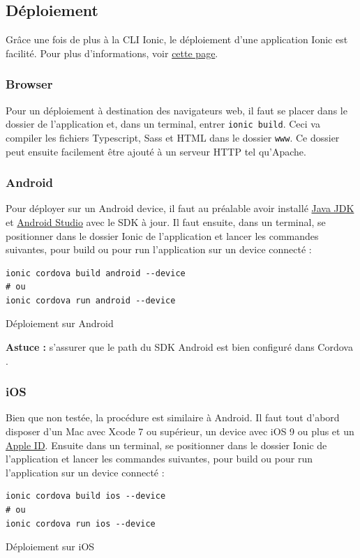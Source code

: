 \documentclass[a4paper, 12pt]{article}
\newenvironment{code}{\captionsetup{type=listing}}{}
\begin{document}
\subsection{Déploiement}
Grâce une fois de plus à la CLI Ionic, le déploiement d'une application Ionic est facilité. Pour plus d'informations, voir
\href{https://ionicframework.com/docs/intro/deploying/}{cette page}.
\subsubsection{Browser}
Pour un déploiement à destination des navigateurs web, il faut se placer dans le dossier de l'application et, dans
un terminal, entrer \texttt{ionic build}. Ceci va compiler les fichiers Typescript, Sass et HTML dans le
dossier \texttt{www}. Ce dossier peut ensuite facilement être ajouté à un serveur HTTP tel qu'Apache.

\subsubsection{Android}
Pour déployer sur un Android device, il faut au préalable avoir installé
\href{http://www.oracle.com/technetwork/java/javase/downloads/index-jsp-138363.html}{Java JDK} et
\href{https://developer.android.com/studio/index.html}{Android Studio} avec le SDK à jour. Il faut ensuite, dans un
terminal, se positionner dans le dossier Ionic de l'application et lancer les commandes suivantes, pour build ou pour
run l'application sur un device connecté :
\begin{code}
    \begin{verbatim}
ionic cordova build android --device
# ou
ionic cordova run android --device
    \end{verbatim}
    \caption{Déploiement sur Android}
\end{code}
\bigbreak
\textbf{Astuce : } s'assurer que le path du SDK Android est bien configuré dans Cordova \cite{ref60}.

\subsubsection{iOS}
Bien que non testée, la procédure est similaire à Android. Il faut tout d'abord disposer d'un Mac avec Xcode 7 ou
supérieur, un device avec iOS 9 ou plus et un \href{https://appleid.apple.com/}{Apple ID}. Ensuite dans un
terminal, se positionner dans le dossier Ionic de l'application et lancer les commandes suivantes, pour build ou pour
run l'application sur un device connecté :
\begin{code}
    \begin{verbatim}
ionic cordova build ios --device
# ou
ionic cordova run ios --device
    \end{verbatim}
    \caption{Déploiement sur iOS}
\end{code}
\bigbreak
\end{document}
